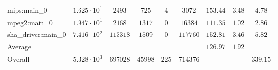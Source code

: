 \begin{tabular}{|l|c|c|c|c|c|c|c|c|}
mips:main\_0            & $ 1.625 \cdot 10^{1}  $ & $ 2493   $ & $ 725   $ & $ 4   $ & $ 3072   $ & $ 153.44      $ & $ 3.48    $ & $ 4.78    $ \\
mpeg2:main\_0           & $ 1.947 \cdot 10^{1}  $ & $ 2168   $ & $ 1317  $ & $ 0   $ & $ 16384  $ & $ 111.35      $ & $ 1.02    $ & $ 2.86    $ \\
sha\_driver:main\_0     & $ 7.416 \cdot 10^{2}  $ & $ 113318 $ & $ 1509  $ & $ 0   $ & $ 117760 $ & $ 152.81      $ & $ 3.46    $ & $ 5.82    $ \\
\hline
Average                 & $                     $ & $        $ & $       $ & $     $ & $        $ & $ 126.97      $ & $ 1.92    $ & $         $ \\
\hline
Overall                 & $ 5.328 \cdot 10^{3}  $ & $ 697028 $ & $ 45998 $ & $ 225 $ & $ 714376 $ & $             $ & $         $ & $ 339.15  $ \\
\hline
\end{tabular}
